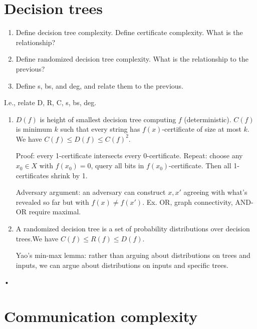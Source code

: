 \section{Decision trees}
\begin{enumerate}
\item
Define decision tree complexity. Define certificate complexity. What is the relationship? %
\item 
Define randomized decision tree complexity. What is the relationship to the previous?
\item Define s, bs, and deg, and relate them to the previous.
\end{enumerate}
I.e., relate D, R, C, s, bs, deg.
\begin{enumerate}
\item
$D(f)$ is height of smallest decision tree computing $f$ (deterministic). $C(f)$ is minimum $k$ such that every string has $f(x)$-certificate of size at most $k$. We have $C(f)\le D(f)\le C(f)^2$.

Proof: every 1-certificate intersects every 0-certificate. Repeat: choose any $x_0\in X$ with $f(x_0)=0$, query all bits in $f(x_0)$-certificate. Then all 1-certificates shrink by 1.

Adversary argument: an adversary can construct $x,x'$ agreeing with what's revealed so far but with $f(x)\ne f(x')$. Ex. OR, graph connectivity, AND-OR require maximal. %
\item
A randomized decision  tree is a set of probability distributions over decision trees.We have $C(f)\le R(f)\le D(f)$.

Yao's min-max lemma: rather than arguing about distributions on trees and inputs, we can argue about distributions on inputs and specific trees.

\end{enumerate}•
\section{Communication complexity}

